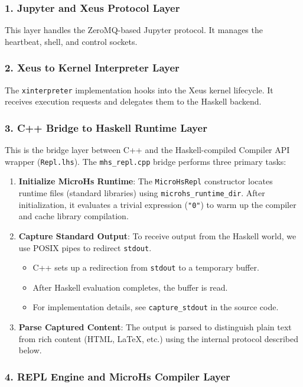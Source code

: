 \documentclass[11pt]{article}
\begin{document}
\subsubsection{1. Jupyter and Xeus Protocol Layer}


This layer handles the ZeroMQ-based Jupyter protocol. It manages the heartbeat, shell, and control sockets.
\subsubsection{2. Xeus to Kernel Interpreter Layer}


The \texttt{xinterpreter} implementation hooks into the Xeus kernel lifecycle. It receives execution requests and delegates them to the Haskell backend.
\subsubsection{3. C++ Bridge to Haskell Runtime Layer}


This is the bridge layer between C++ and the Haskell-compiled Compiler API wrapper (\texttt{Repl.lhs}).
The \texttt{mhs\_repl.cpp} bridge performs three primary tasks:
\begin{enumerate}
\item \textbf{Initialize MicroHs Runtime}:
   The \texttt{MicroHsRepl} constructor locates runtime files (standard libraries) using \texttt{microhs\_runtime\_dir}. After initialization, it evaluates a trivial expression (\texttt{"0"}) to warm up the compiler and cache library compilation.
\item \textbf{Capture Standard Output}:
   To receive output from the Haskell world, we use POSIX pipes to redirect \texttt{stdout}.
   \begin{itemize}
   \item C++ sets up a redirection from \texttt{stdout} to a temporary buffer.
   \item After Haskell evaluation completes, the buffer is read.
   \item For implementation details, see \texttt{capture\_stdout} in the source code.
   \end{itemize}
\item \textbf{Parse Captured Content}:
   The output is parsed to distinguish plain text from rich content (HTML, LaTeX, etc.) using the internal protocol described below.
\end{enumerate}


\subsubsection{4. REPL Engine and MicroHs Compiler Layer}
\end{document}
